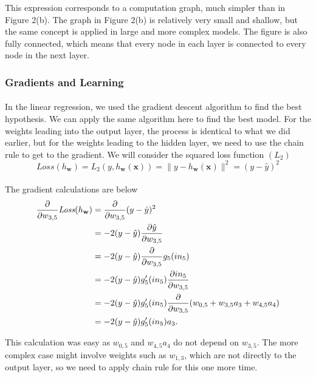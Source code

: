 \documentclass{article}
\begin{document}
         This expression corresponds to a computation graph, much simpler than in  Figure 2(b). The graph in Figure 2(b) is relatively very small and shallow, but the same concept is applied in large and more complex models. The figure is also fully connected, which means that every node in each layer is connected to every node in the next layer.
    \subsubsection{Gradients and Learning}
    \paragraph{} In the linear regression, we used the gradient descent algorithm to find the best hypothesis. We can apply the same algorithm here to find the best model. For the weights leading into the output layer, the process is identical to what we did earlier, but for the weights leading to the hidden layer, we need to use the chain rule to get to the gradient. We will consider the squared loss function $(L_2)$
    \begin{equation*}
      \textit{Loss}(h_\mathbf{w}) = L_2(y, h_{\mathbf{w}}(\mathbf{x})) = \| y - h_{\mathbf{w}}(\mathbf{x}) \|^2 = (y - \hat{y})^2
    \end{equation*}

    \paragraph{} The gradient calculations are below
    \begin{align*}
      \frac{\partial}{\partial w_{3,5}} \emph{Loss}(h_{\mathbf{w}}) &= \frac{\partial}{\partial w_{3,5}} (y - \hat{y})^2 \\
      &= -2 (y - \hat{y}) \frac{\partial \hat{y}}{\partial w_{3,5}} \\
      &= -2 (y - \hat{y}) \frac{\partial}{\partial w_{3,5}} g_5(in_5) \\
      &= -2 (y - \hat{y}) g_5'(in_5) \frac{\partial in_5}{\partial w_{3,5}} \\
      &= -2 (y - \hat{y}) g_5'(in_5) \frac{\partial}{\partial w_{3,5}} (w_{0,5} + w_{3,5}a_3 + w_{4,5}a_4) \\
      &= -2 (y - \hat{y}) g_5'(in_5) a_3.
    \end{align*}

    This calculation was easy as $w_{0,5}$ and $w_{4,5}a_4$ do not depend on $w_{3,5}$. The more complex case might involve weights such as $w_{1,3}$, which are not directly to the output layer, so we need to apply chain rule for this one more time.
\end{document}
